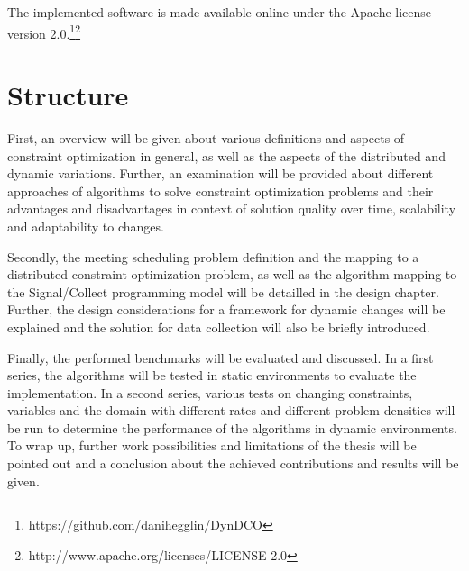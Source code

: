 \newline \newline
The implemented software is made available online under the Apache license version 2.0.\footnote{https://github.com/danihegglin/DynDCO}\footnote{http://www.apache.org/licenses/LICENSE-2.0}


\section{Structure}
First, an overview will be given about various definitions and aspects of constraint optimization in general, as well as the aspects of  the distributed and dynamic variations. Further, an examination will be provided about different approaches of algorithms to solve constraint optimization problems and their advantages and disadvantages in context of solution quality over time, scalability and adaptability to changes. 

Secondly, the meeting scheduling problem definition and the mapping to a distributed constraint optimization problem, as well as the algorithm mapping to the Signal/Collect programming model will be detailled in the design chapter. Further, the design considerations for a framework for dynamic changes will be explained and the solution for data collection will also be briefly introduced.

Finally, the performed benchmarks will be evaluated and discussed. In a first series, the algorithms will be tested in static environments to evaluate the implementation. In a second series, various tests on changing constraints, variables and the domain with different rates and different problem densities will be run to determine the performance of the algorithms in dynamic environments. To wrap up, further work possibilities and limitations of the thesis will be pointed out and a conclusion about the achieved contributions and results will be given.